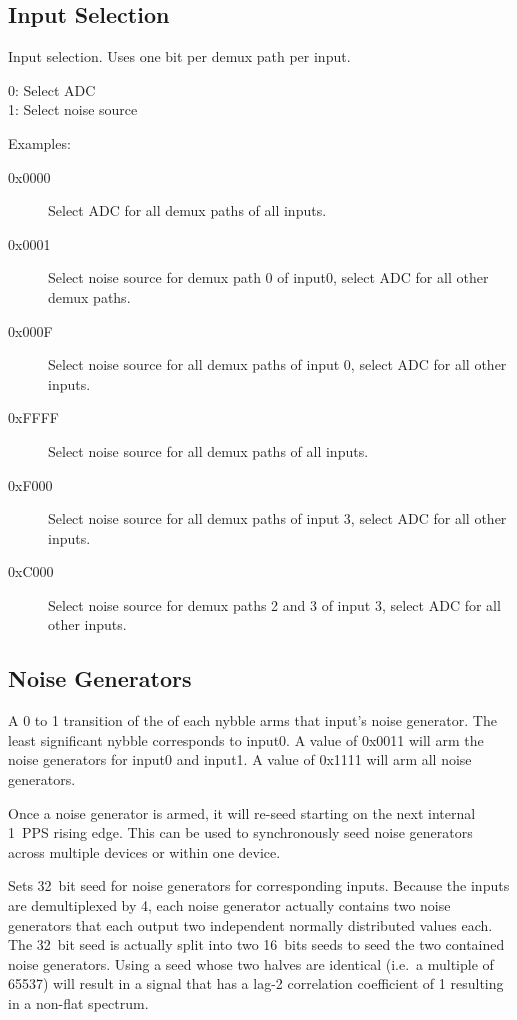 \documentclass[12pt]{article}
\begin{document}
  \subsection{Input Selection}

\begin{description}

  Input selection.  Uses one bit per demux path per input.

0: Select ADC \\
1: Select noise source

Examples:
\begin{description}

\item[0x0000] Select ADC for all demux paths of all inputs.
\item[0x0001] Select noise source for demux path 0 of input0, select ADC  for
               all other demux paths.
\item[0x000F] Select noise source for all demux paths of input 0, select ADC
               for all other inputs.
\item[0xFFFF] Select noise source for all demux paths of all inputs.
\item[0xF000] Select noise source for all demux paths of input 3, select ADC
               for all other inputs.
\item[0xC000] Select noise source for demux paths 2 and 3 of input 3, select
               ADC for all other inputs.
\end{description}
\end{description}

  \subsection{Noise Generators}

\begin{description}

  A 0 to 1 transition of the \LSb of each
nybble arms that input's noise generator.  The least significant nybble
corresponds to input0.  A value of 0x0011 will arm the noise generators for
input0 and input1.  A value of 0x1111 will arm all noise generators.

Once a noise generator is armed, it will re-seed starting on the next internal
1~PPS rising edge.  This can be used to synchronously seed noise generators
across multiple devices or within one device.

\filbreak
{}
 Sets 32~bit seed for noise generators for corresponding
inputs.  Because the inputs are demultiplexed by 4, each noise generator
actually contains two noise generators that each output two independent
normally distributed values each.  The 32~bit seed is actually split into two
16~bits seeds to seed the two contained noise generators.  Using a seed whose
two halves are identical (i.e.\ a multiple of 65537) will result in a signal
that has a lag-2 correlation coefficient of 1 resulting in a non-flat spectrum.

\end{description}
\end{document}
